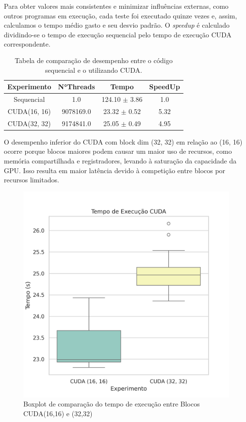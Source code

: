 \documentclass[12pt]{article}
\begin{document}
Para obter valores mais consistentes e minimizar influências externas, como
outros programas em execução, cada teste foi executado quinze vezes e, assim,
calculamos o tempo médio gasto e seu desvio padrão. O \textit{speedup} é
calculado dividindo-se o tempo de execução sequencial pelo tempo de execução
CUDA correspondente.

\begin{table}[ht]
  \centering
  \caption{Tabela de comparação de desempenho entre o código sequencial e o
    utilizando CUDA.}
  \vspace{0.3cm}
  \begin{tabular}{||c c c c||}
    \hline
    Experimento  & N°Threads & Tempo             & SpeedUp \\ [0.5ex]
    \hline\hline
    Sequencial   & 1.0       & 124.10 $\pm$ 3.86 & 1.0     \\
    \hline
    CUDA(16, 16) & 9078169.0 & 23.32 $\pm$ 0.52  & 5.32    \\
    \hline
    CUDA(32, 32) & 9174841.0 & 25.05 $\pm$ 0.49  & 4.95    \\
    \hline
  \end{tabular}
\end{table}

O desempenho inferior do CUDA com block dim (32, 32) em relação ao (16, 16)
ocorre porque blocos maiores podem causar um maior uso de recursos, como
memória compartilhada e registradores, levando à saturação da capacidade da
GPU. Isso resulta em maior latência devido à competição entre blocos por
recursos limitados.

\begin{figure}[ht]
  \centering
  \includegraphics[width=.40\textwidth]{figs/times_boxplot_cuda.png}
  \caption{Boxplot de comparação do tempo de execução entre Blocos CUDA(16,16) e (32,32)}\label{fig:boxplot_cuda}
\end{figure}
\end{document}

